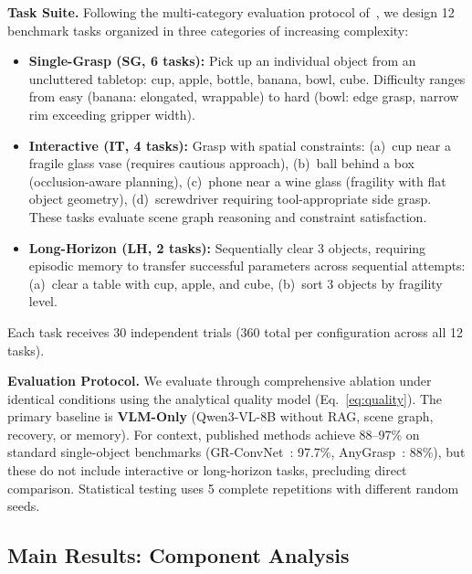 \documentclass[letterpaper, 10pt, conference]{ieeeconf}
\begin{document}
\textbf{Task Suite.}
Following the multi-category evaluation protocol of~\cite{liu2025robodexvlm}, we design 12 benchmark tasks organized in three categories of increasing complexity:
\begin{itemize}
    \item \textbf{Single-Grasp (SG, 6 tasks):} Pick up an individual object from an uncluttered tabletop: cup, apple, bottle, banana, bowl, cube.
    Difficulty ranges from easy (banana: elongated, wrappable) to hard (bowl: edge grasp, narrow rim exceeding gripper width).
    
    \item \textbf{Interactive (IT, 4 tasks):} Grasp with spatial constraints:
    (a)~cup near a fragile glass vase (requires cautious approach),
    (b)~ball behind a box (occlusion-aware planning),
    (c)~phone near a wine glass (fragility with flat object geometry),
    (d)~screwdriver requiring tool-appropriate side grasp.
    These tasks evaluate scene graph reasoning and constraint satisfaction.
    
    \item \textbf{Long-Horizon (LH, 2 tasks):} Sequentially clear 3 objects, requiring episodic memory to transfer successful parameters across sequential attempts:
    (a)~clear a table with cup, apple, and cube,
    (b)~sort 3 objects by fragility level.
\end{itemize}

Each task receives 30 independent trials (360 total per configuration across all 12 tasks).

\textbf{Evaluation Protocol.}
We evaluate through comprehensive ablation under identical conditions using the analytical quality model (Eq.~\ref{eq:quality}).
The primary baseline is \textbf{VLM-Only} (Qwen3-VL-8B without RAG, scene graph, recovery, or memory).
For context, published methods achieve 88--97\% on standard single-object benchmarks (GR-ConvNet~\cite{kumra2020grconvnet}: 97.7\%, AnyGrasp~\cite{fang2023anygrasp}: 88\%), but these do not include interactive or long-horizon tasks, precluding direct comparison.
Statistical testing uses 5 complete repetitions with different random seeds.

\vspace{-1mm}
\subsection{Main Results: Component Analysis}
\label{sec:sota}
\end{document}
